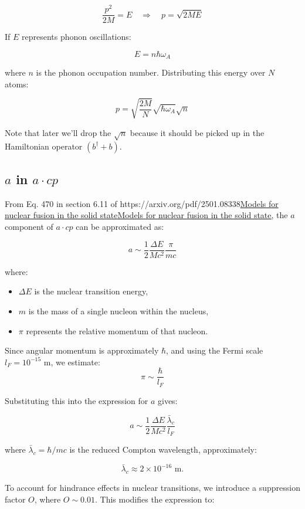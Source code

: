 \documentclass[
]{article}
\let\oldhref\href
\renewcommand{\href}[2]{\ifx#1\urlprefix\oldhref{#1}{#2}\else\uline{\oldhref{#1}{#2}}\fi}
\renewcommand{\[}{\begin{equation}}
\renewcommand{\]}{\end{equation}}
\providecommand{\tightlist}{%
  \setlength{\itemsep}{0pt}\setlength{\parskip}{0pt}}
\begin{document}
\[
\frac{p^2}{2M} = E \quad \Rightarrow \quad p = \sqrt{2ME}
\]

If \(E\) represents phonon oscillations:

\[
E = n \hbar \omega_A 
\]

where \(n\) is the phonon occupation number. Distributing this energy
over \(N\) atoms:

\[
p = \sqrt{\frac{2M}{N}} \sqrt{\hbar \omega_A} \sqrt{n} \label{eq:p}
\]

Note that later we'll drop the \(\sqrt{n}\) because it should be picked
up in the Hamiltonian operator \((b^{\dagger} + b)\).

\subsection{\texorpdfstring{\(a\) in
\(a \cdot cp\)}{a in a \textbackslash cdot cp}}\label{a-in-a-cdot-cp}

From Eq. 470 in section 6.11 of
\href{https://arxiv.org/pdf/2501.08338}{Models for nuclear fusion in the
solid state}, the \(a\) component of \(a \cdot cp\) can be approximated
as:

\[
a \sim \frac{1}{2} \frac{\Delta E}{M c^2} \frac{\pi}{m c}
\]

where:

\begin{itemize}
\tightlist
\item
  \(\Delta E\) is the nuclear transition energy,
\item
  \(m\) is the mass of a single nucleon within the nucleus,
\item
  \(\pi\) represents the relative momentum of that nucleon.
\end{itemize}

Since angular momentum is approximately \(\hbar\), and using the Fermi
scale \(l_F = 10^{-15}\) m, we estimate: \[
\pi \sim \frac{\hbar}{l_F} 
\]

Substituting this into the expression for \(a\) gives:

\[
a \sim \frac{1}{2} \frac{\Delta E}{M c^2} \frac{\bar\lambda_c}{l_F}
\]

where \(\bar\lambda_c = \hbar / m c\) is the reduced Compton wavelength,
approximately:

\[
\bar\lambda_c \approx 2 \times 10^{-16} \text{ m}.
\]

To account for hindrance effects in nuclear transitions, we introduce a
suppression factor \(O\), where \(O \sim 0.01\). This modifies the
expression to:
\end{document}
